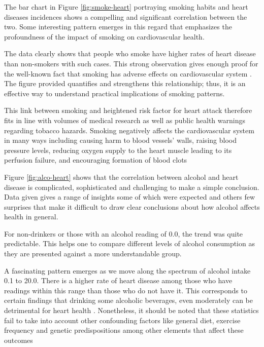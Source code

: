 \documentclass[12pt, a4paper,twoside]{report}
\numberwithin{equation}{chapter}
\begin{document}
The bar chart in Figure \ref{fig:smoke-heart} portraying smoking habits and heart diseases incidences shows a compelling and significant correlation between the two. Some interesting pattern emerges in this regard that emphasizes the profoundness of the impact of smoking on cardiovascular health.

The data clearly shows that people who smoke have higher rates of heart disease than non-smokers with such cases. This strong observation gives enough proof for the well-known fact that smoking has adverse effects on cardiovascular system \parencite{fda_2021}. The figure provided quantifies and strengthens this relationship; thus, it is an effective way to understand practical implications of smoking patterns.

This link between smoking and heightened risk factor for heart attack therefore fits in line with volumes of medical research as well as public health warnings regarding tobacco hazards. Smoking negatively affects the cardiovascular system in many ways including causing harm to blood vessels' walls, raising blood pressure levels, reducing oxygen supply to the heart muscle leading to its perfusion failure, and encouraging formation of blood clots \parencite{jayet2005}



Figure \ref{fig:alco-heart} shows that the correlation between alcohol and heart disease is complicated, sophisticated and challenging to make a simple conclusion. Data given gives a range of insights some of which were expected and others few surprises that make it difficult to draw clear conclusions about how alcohol affects health in general.

For non-drinkers or those with an alcohol reading of 0.0, the trend was quite predictable. This helps one to compare different levels of alcohol consumption as they are presented against a more understandable group.

A fascinating pattern emerges as we move along the spectrum of alcohol intake  0.1 to 20.0. There is a higher rate of heart disease among those who have readings within this range than those who do not have it. This corresponds to certain findings that drinking some alcoholic beverages, even moderately can be detrimental for heart health  \parencite{piano2017}. Nonetheless, it should be noted that these statistics fail to take into account other confounding factors like general diet, exercise frequency and genetic predispositions among other elements that affect these outcomes
\end{document}
